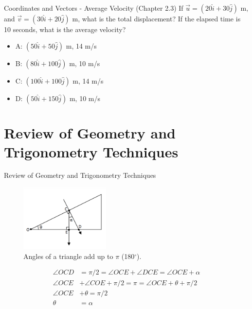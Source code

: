 \documentclass{beamer}
\begin{document}
\begin{frame}{Coordinates and Vectors - Average Velocity (Chapter 2.3)}
If $\vec{u} = (20\hat{i}+30\hat{j})$ m, and $\vec{v} = (30\hat{i}+20\hat{j})$ m, what is the total displacement?  If the elapsed time is 10 seconds, what is the average velocity? \\
\vspace{0.2cm}
\begin{itemize}
\item A: $(50\hat{i} + 50\hat{j})$ m, 14 m/s
\item B: $(80\hat{i} + 100\hat{j})$ m, 10 m/s
\item C: $(100\hat{i} + 100\hat{j})$ m, 14 m/s
\item D: $(50\hat{i} + 150\hat{j})$ m, 10 m/s
\end{itemize}
\end{frame}

\section{Review of Geometry and Trigonometry Techniques}

\begin{frame}{Review of Geometry and Trigonometry Techniques}
\small
\begin{figure}
\centering
\includegraphics[width=0.4\textwidth]{figures/incline.png}
\caption{\label{fig:incline} Angles of a triangle add up to $\pi$ (180$^{\circ}$).}
\end{figure}
\begin{align}
\angle OCD &= \pi/2 = \angle OCE + \angle DCE = \angle OCE + \alpha \\
\angle OCE & + \angle COE + \pi/2 = \pi = \angle OCE + \theta + \pi/2 \\
\angle OCE &+ \theta = \pi/2 \\
\theta &= \alpha
\end{align}
\end{frame}
\end{document}
